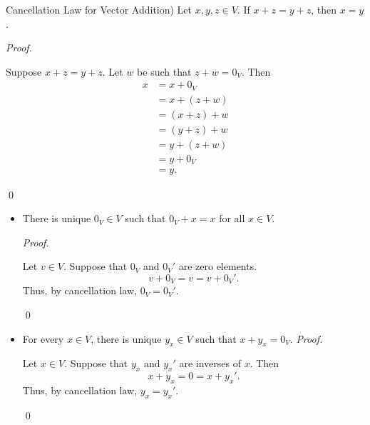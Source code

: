 \documentclass[12pt]{article}
\newenvironment{theorem}[2][Theorem]{\begin{trivlist}
\item[\hskip \labelsep {\bfseries #1}\hskip \labelsep {\bfseries #2.}]}{\end{trivlist}}
\newenvironment{corollary}[2][Corollary]{\begin{trivlist}
\item[\hskip \labelsep {\bfseries #1}\hskip \labelsep {\bfseries #2}]}{\end{trivlist}}
\newenvironment{sol}
    {\emph{Proof.}
    }
    {
    \qed
    }
\begin{document}
\begin{theorem}{1.1}
(Cancellation Law for Vector Addition) Let $x,y,z \in V$. If $x + z = y + z$, then $x = y$.
\end{theorem}

\begin{sol}
Suppose $x + z = y + z$. Let $w$ be such that $z + w = 0_V$. Then 
\begin{align*}
    x &= x + 0_V \\
    &= x + (z + w) \\
    &= (x + z) + w \\
    &= (y + z) + w \\
    &= y + (z + w) \\
    &= y + 0_V \\
    &= y.
\end{align*}
\end{sol}

\begin{corollary}{2} \text{ }

\begin{itemize}
    \item There is unique $0_V \in V$ such that $0_V + x = x$ for all $x \in V$.
    
    \begin{sol}
    Let $v \in V$. Suppose that $0_V$ and $0_V'$ are zero elements. $$v + 0_V = v = v + 0_V'.$$ Thus, by cancellation law, $0_V = 0_V'$.
    \end{sol}
    
    \item For every $x \in V$, there is unique $y_x \in V$ such that $x + y_x = 0_V$.
    \begin{sol}
    Let $x \in V$. Suppose that $y_x$ and $y_x'$ are inverses of $x$. Then $$x + y_x = 0 = x + y_x'.$$ Thus, by cancellation law, $y_x = y_x'$.
    \end{sol}
\end{itemize}
\end{corollary}
\end{document}
